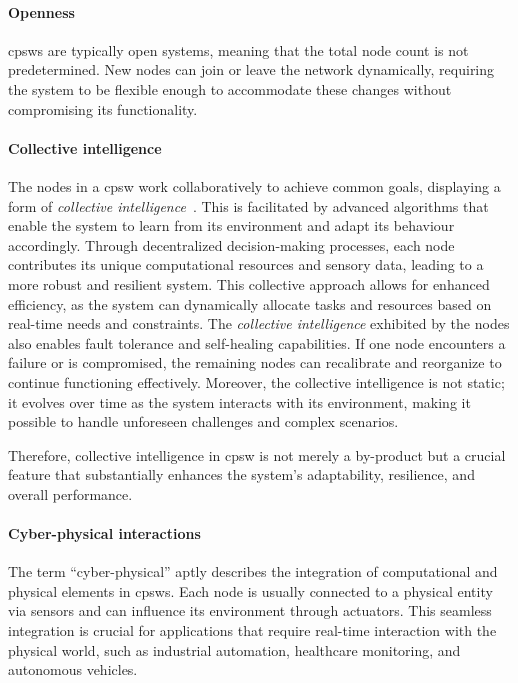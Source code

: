 \paragraph*{Openness}
\acp{cpsw} are typically open systems, 
 meaning that the total node count is not predetermined. 
 New nodes can join or leave the network dynamically, 
  requiring the system to be flexible enough to accommodate these changes without compromising its functionality.

\paragraph*{Collective intelligence}
The nodes in a \ac{cpsw} work collaboratively to achieve common goals, 
 displaying a form of \emph{collective intelligence}~\cite{nguyen2009computational}. 
 This is facilitated by advanced algorithms that enable the system to learn from its environment and adapt its behaviour accordingly. 
 Through decentralized decision-making processes, each node contributes its unique computational resources and sensory data, leading to a more robust and resilient system. 
 This collective approach allows for enhanced efficiency, as the system can dynamically allocate tasks and resources based on real-time needs and constraints.
%
The \emph{collective intelligence} exhibited by the nodes also enables fault tolerance and self-healing capabilities. 
 If one node encounters a failure or is compromised, 
 the remaining nodes can recalibrate and reorganize to continue functioning effectively. 
 Moreover, the collective intelligence is not static; 
 it evolves over time as the system interacts with its environment, 
 making it possible to handle unforeseen challenges and complex scenarios.

Therefore, collective intelligence in \ac{cpsw} is not merely a by-product but a crucial feature that substantially enhances the system's adaptability, resilience, and overall performance.
\paragraph*{Cyber-physical interactions}
The term ``cyber-physical'' aptly describes the integration of computational and physical elements in \acp{cpsw}. 
 Each node is usually connected to a physical entity via sensors and can influence its environment through actuators. 
 This seamless integration is crucial for applications that require real-time interaction with the physical world, such as industrial automation, healthcare monitoring, and autonomous vehicles.

